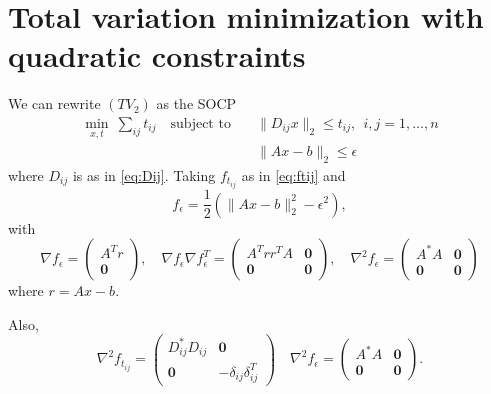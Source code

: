 \documentclass{article}
\newcommand{\bpm}{\left(\begin{matrix}}
\newcommand{\epm}{\end{matrix}\right)}
\newcommand{\grad}{\nabla}
\newcommand{\<}{\langle}
\renewcommand{\>}{\rangle}
\newcommand{\vzero}{\mathbf{0}}
\begin{document}
\section{Total variation minimization with quadratic constraints}
\label{sec:tvqc}

We can rewrite $(TV_2)$ as the SOCP
\begin{align*}
\min_{x,t}~\sum_{ij} t_{ij}
\quad\text{subject~to}\quad
& \|D_{ij} x\|_2\leq t_{ij}, ~~ i,j=1,\ldots,n \\[-4mm]
& \|Ax - b\|_2 \leq \epsilon
\end{align*}
where $D_{ij}$ is as in \eqref{eq:Dij}.
%
Taking $f_{t_{ij}}$ as in \eqref{eq:ftij} and 
\[
f_\epsilon = \frac{1}{2}\left( \|Ax-b\|^2_2 - \epsilon^2\right),
\]
with
\[
\grad f_\epsilon = \bpm A^Tr \\ \vzero \epm,\quad 
\grad f_\epsilon \grad f_\epsilon^T =
\bpm  A^Trr^TA & \vzero \\ \vzero & \vzero \epm, \quad
\grad^2 f_\epsilon = \bpm A^*A & \vzero \\
\vzero & \vzero \epm
\]
where $r = Ax-b$.


 Also,
\[
\grad^2 f_{t_{ij}} = \left(\begin{array}{cc} D_{ij}^*D_{ij} & \vzero \\
\vzero & -\delta_{ij}\delta_{ij}^T \end{array}\right)
\quad
\grad^2 f_\epsilon = \left(\begin{array}{cc} A^*A & \vzero \\
\vzero & \vzero \end{array}\right).
\]
\end{document}
